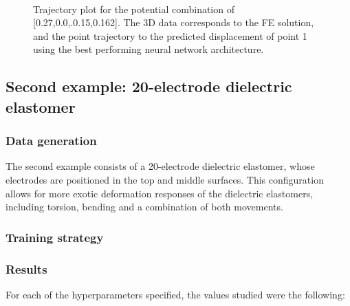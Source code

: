 \begin{figure}
  \centering
  \\
  \caption{Trajectory plot  for the potential combination of [0.27,0.0,.0.15,0.162]. The 3D data corresponds to the FE solution, and the point trajectory to the predicted displacement of point 1 using the best performing neural network architecture.}\label{fig:}
\end{figure}


\subsection{Second example: 20-electrode dielectric elastomer}

\subsubsection{Data generation}

The second example consists of a 20-electrode dielectric elastomer, whose electrodes are positioned in the top and middle surfaces. This configuration allows for more exotic deformation responses of the dielectric elastomers, including torsion, bending and a combination of both movements.


\subsubsection{Training strategy}
\subsubsection{Results}

For each of the hyperparameters specified, the values studied were the following:

